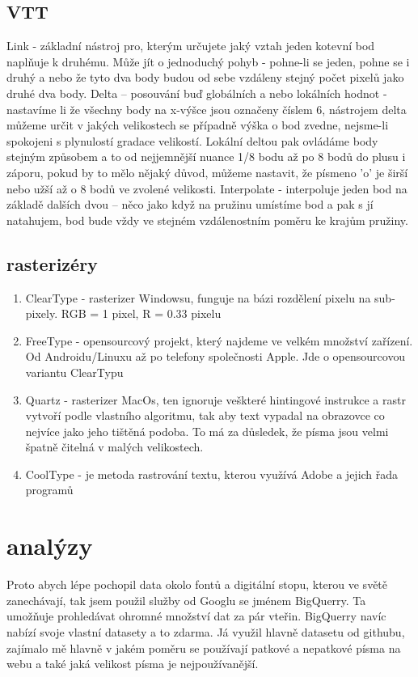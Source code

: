 \documentclass[a4paper]{article}
\begin{document}
\subsection{VTT}
Link - základní nástroj pro, kterým určujete jaký vztah jeden kotevní bod naplňuje k druhému. Může jít o jednoduchý pohyb - pohne-li se jeden, pohne se i druhý a nebo že tyto dva body budou od sebe vzdáleny stejný počet pixelů jako druhé dva body. Delta – posouvání buď globálních a nebo lokálních hodnot - nastavíme li že všechny body na x-výšce jsou označeny číslem 6, nástrojem delta můžeme určit v jakých velikostech se případně výška o bod zvedne, nejsme-li spokojeni s plynulostí gradace velikostí. Lokální deltou pak ovládáme body stejným způsobem a to od nejjemnější nuance 1/8 bodu až po 8 bodů do plusu i záporu, pokud by to mělo nějaký důvod, můžeme nastavit, že písmeno 'o' je širší nebo užší až o 8 bodů ve zvolené velikosti. Interpolate - interpoluje jeden bod na základě dalších dvou – něco jako když na pružinu umístíme bod a pak s jí natahujem, bod bude vždy ve stejném vzdálenostním poměru ke krajům pružiny.

\subsection{rasterizéry}
\begin{enumerate}
\item ClearType - rasterizer Windowsu, funguje na bázi rozdělení pixelu na sub-pixely. RGB = 1 pixel, R = 0.33 pixelu

\item FreeType - opensourcový projekt, který najdeme ve velkém množství zařízení. Od Androidu/Linuxu až po telefony společnosti Apple. Jde o opensourcovou variantu ClearTypu

\item Quartz - rasterizer MacOs, ten ignoruje veškteré hintingové instrukce a rastr vytvoří podle vlastního algoritmu, tak aby text vypadal na obrazovce co nejvíce jako jeho tištěná podoba. To má za důsledek, že písma jsou velmi špatně čitelná v malých velikostech.

\item CoolType - je metoda rastrování textu, kterou využívá Adobe a jejich řada programů
\end{enumerate}

\section{analýzy}
Proto abych lépe pochopil data okolo fontů a digitální stopu, kterou ve světě zanechávají, tak jsem použil služby od Googlu se jménem BigQuerry. Ta umožňuje prohledávat ohromné množství dat za pár vteřin. BigQuerry navíc nabízí svoje vlastní datasety a to zdarma. Já využil hlavně datasetu od githubu, zajímalo mě hlavně v jakém poměru se používají patkové a nepatkové písma na webu a také jaká velikost písma je nejpoužívanější.
\end{document}
